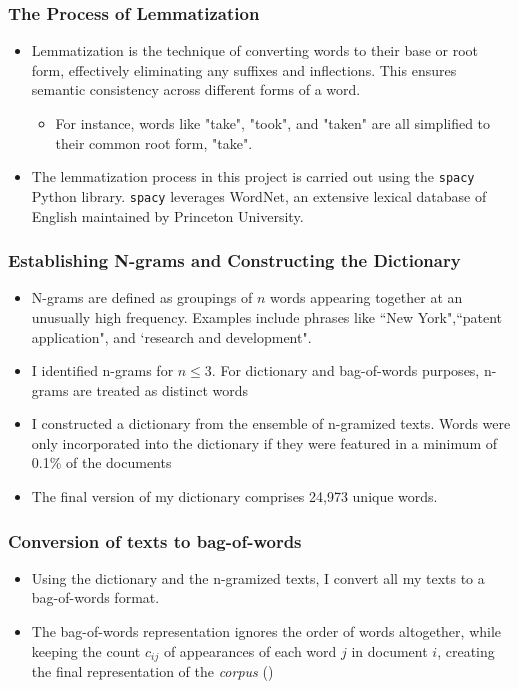 \documentclass{beamer}
\begin{document}
\begin{frame}
\frametitle{The Process of Lemmatization}
\label{slide:lemma}
\begin{itemize}
\item Lemmatization is the technique of converting words to their base or root form, effectively eliminating any suffixes and inflections. This ensures semantic consistency across different forms of a word.
\begin{itemize}
  \item For instance, words like "take", "took", and "taken" are all simplified to their common root form, "take".
\end{itemize}
\item The lemmatization process in this project is carried out using the \texttt{spacy} Python library. \texttt{spacy} leverages WordNet, an extensive lexical database of English maintained by Princeton University. 
\end{itemize}
\end{frame}

\begin{frame}
\frametitle{Establishing N-grams and Constructing the Dictionary}
\label{slide:ngram_main}
\begin{itemize}
\item N-grams are defined as groupings of $n$ words appearing together at an unusually high frequency. Examples include phrases like ``New York",``patent application", and `research and development".\hyperlink{slide:ngram_details}{}

\item I identified n-grams for $n \leq 3$. For dictionary and bag-of-words purposes, n-grams are treated as distinct words
\item I constructed a dictionary from the ensemble of n-gramized texts. Words were only incorporated into the dictionary if they were featured in a minimum of 0.1\% of the documents %

\item The final version of my dictionary comprises 24,973 unique words. %
\end{itemize}
\normalsize
\end{frame}

\begin{frame}
\frametitle{Conversion of texts to bag-of-words}
\label{slide:bagofwords}
\begin{itemize}
\item Using the dictionary and the n-gramized texts, I convert all my texts to a bag-of-words format.
\item The bag-of-words representation ignores the order of words altogether, while keeping the count $c_{ij}$ of appearances of each word $j$ in document $i$, creating the final representation of the \textit{corpus} (\cite{Gentzkow2019-va})
\end{itemize}
\end{frame}
\end{document}

